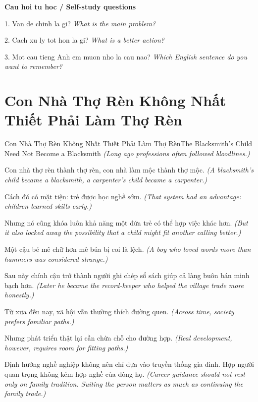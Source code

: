 \begin{tuhocnhanh}
\textbf{Cau hoi tu hoc / Self-study questions}

1. Van de chinh la gi? \textit{What is the main problem?}

2. Cach xu ly tot hon la gi? \textit{What is a better action?}

3. Mot cau tieng Anh em muon nho la cau nao? \textit{Which English sentence do you want to remember?}
\end{tuhocnhanh}
\ngancach

\section{Con Nhà Thợ Rèn Không Nhất Thiết Phải Làm Thợ Rèn}
\begin{truyen}{Con Nhà Thợ Rèn Không Nhất Thiết Phải Làm Thợ Rèn}{The Blacksmith’s Child Need Not Become a Blacksmith}
\textit{(Long ago professions often followed bloodlines.)}

Con nhà thợ rèn thành thợ rèn, con nhà làm mộc thành thợ mộc.
\textit{(A blacksmith’s child became a blacksmith, a carpenter’s child became a carpenter.)}

Cách đó có mặt tiện: trẻ được học nghề sớm.
\textit{(That system had an advantage: children learned skills early.)}

Nhưng nó cũng khóa luôn khả năng một đứa trẻ có thể hợp việc khác hơn.
\textit{(But it also locked away the possibility that a child might fit another calling better.)}

Một cậu bé mê chữ hơn mê búa bị coi là lệch.
\textit{(A boy who loved words more than hammers was considered strange.)}

Sau này chính cậu trở thành người ghi chép sổ sách giúp cả làng buôn bán minh bạch hơn.
\textit{(Later he became the record-keeper who helped the village trade more honestly.)}

Từ xưa đến nay, xã hội vẫn thường thích đường quen.
\textit{(Across time, society prefers familiar paths.)}

Nhưng phát triển thật lại cần chừa chỗ cho đường hợp.
\textit{(Real development, however, requires room for fitting paths.)}

\end{truyen}

\begin{baihoc}
Định hướng nghề nghiệp không nên chỉ dựa vào truyền thống gia đình. Hợp người quan trọng không kém hợp nghề của dòng họ.
\textit{(Career guidance should not rest only on family tradition. Suiting the person matters as much as continuing the family trade.)}
\end{baihoc}

